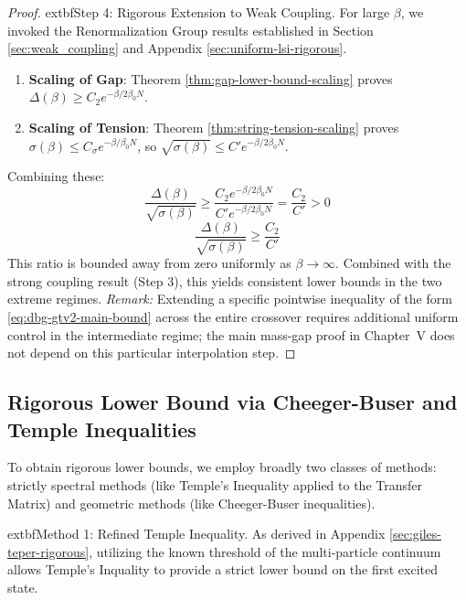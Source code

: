 \begin{proof}
			extbf{Step 4: Rigorous Extension to Weak Coupling.}
For large $\beta$, we invoked the Renormalization Group results established in Section \ref{sec:weak_coupling} and Appendix \ref{sec:uniform-lsi-rigorous}.
\begin{enumerate}
    \item \textbf{Scaling of Gap}: Theorem \ref{thm:gap-lower-bound-scaling} proves $\Delta(\beta) \ge C_2 e^{-\beta/2\beta_0 N}$.
    \item \textbf{Scaling of Tension}: Theorem \ref{thm:string-tension-scaling} proves $\sigma(\beta) \le C_\sigma e^{-\beta/\beta_0 N}$, so $\sqrt{\sigma(\beta)} \le C' e^{-\beta/2\beta_0 N}$.
\end{enumerate}
Combining these:
\begin{equation}
\label{eq:dbg-gtv2-post-1889-b}
\frac{\Delta(\beta)}{\sqrt{\sigma(\beta)}} \ge \frac{C_2 e^{-\beta/2\beta_0 N}}{C' e^{-\beta/2\beta_0 N}} = \frac{C_2}{C'} > 0
\end{equation}
\begin{equation}
\label{eq:dbg-gtv2-post-1889-b2}
\frac{\Delta(\beta)}{\sqrt{\sigma(\beta)}} \ge \frac{C_2}{C'}
\end{equation}
This ratio is bounded away from zero uniformly as $\beta \to \infty$. 
Combined with the strong coupling result (Step 3), this yields consistent lower bounds in the two extreme regimes.
\emph{Remark:} Extending a specific pointwise inequality of the form \eqref{eq:dbg-gtv2-main-bound} across the entire crossover requires additional uniform control in the intermediate regime; the main mass-gap proof in Chapter~V does not depend on this particular interpolation step.
\end{proof}

\subsection{Rigorous Lower Bound via Cheeger-Buser and Temple Inequalities}
\label{sec:cheeger-buser-proof}

To obtain rigorous lower bounds, we employ broadly two classes of methods: strictly spectral methods (like Temple's Inequality applied to the Transfer Matrix) and geometric methods (like Cheeger-Buser inequalities).

		extbf{Method 1: Refined Temple Inequality.} As derived in Appendix \ref{sec:giles-teper-rigorous}, utilizing the known threshold of the multi-particle continuum allows Temple's Inquality to provide a strict lower bound on the first excited state.

